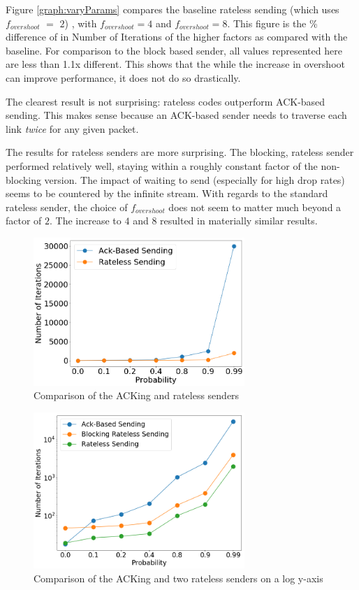 Figure \ref{graph:varyParams} compares the baseline rateless sending (which uses $f_{overshoot}$ $=$ $2$) , with $f_{overshoot} = 4$ and $f_{overshoot} = 8$. This figure is the \% difference of in Number of Iterations of the higher factors as compared with the baseline. For comparison to the block based sender, all values represented here are less than 1.1x different. This shows that the while the increase in overshoot can improve performance, it does not do so drastically.

The clearest result is not surprising: rateless codes outperform ACK-based sending. This makes sense because an ACK-based sender needs to traverse each link \textit{twice} for any given packet. 

The results for rateless senders are more surprising. The blocking, rateless sender performed relatively well, staying within a roughly constant factor of the non-blocking version. The impact of waiting to send (especially for high drop rates) seems to be countered by the infinite stream. With regards to the standard rateless sender, the choice of $f_{overshoot}$ does not seem to matter much beyond a factor of $2$. The increase to $4$ and $8$ resulted in materially similar results.

\begin{figure}[tp]
\centering
\noindent
\includegraphics[width=8cm]{figures/ACK_RATELESS_FINAL.png}
\caption{Comparison of the ACKing and rateless senders}
\label{graph:ackvsrateless}
\end{figure}

\begin{figure}[tp]
\centering
\noindent
\includegraphics[width=8cm]{figures/TRIPLE_FINAL.png}
\caption{Comparison of the ACKing and two rateless senders on a log y-axis}
\label{graph:ackvsratelessLOG}
\end{figure}

